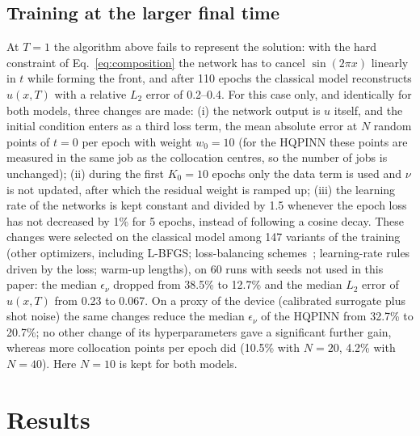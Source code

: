 \documentclass[floatfix,aps,pra,twocolumn,showpacs,superscriptaddress,10pt,nofootinbib]{revtex4-2}
\newif\ifshowtodos \showtodostrue
\newcommand{\TODO}[1]{\ifshowtodos\textcolor{red}{\textbf{[TODO:} #1\textbf{]}}\fi}
\begin{document}
\subsection{Training at the larger final time}\label{sec:adjust}
At $T=1$ the algorithm above fails to represent the solution: with the hard constraint of Eq.~\eqref{eq:composition} the network has to cancel $\sin(2\pi x)$ linearly in $t$ while forming the front, and after 110 epochs the classical model reconstructs $u(x,T)$ with a relative $L_2$ error of 0.2--0.4. For this case only, and identically for both models, three changes are made: (i) the network output is $u$ itself, and the initial condition enters as a third loss term, the mean absolute error at $N$ random points of $t=0$ per epoch with weight $w_0=10$ (for the HQPINN these points are measured in the same job as the collocation centres, so the number of jobs is unchanged); (ii) during the first $K_0=10$ epochs only the data term is used and $\nu$ is not updated, after which the residual weight is ramped up; (iii) the learning rate of the networks is kept constant and divided by 1.5 whenever the epoch loss has not decreased by 1\% for 5 epochs, instead of following a cosine decay. These changes were selected on the classical model among 147 variants of the training (other optimizers, including L-BFGS; loss-balancing schemes~\cite{wang2021understanding}; learning-rate rules driven by the loss; warm-up lengths), on 60 runs with seeds not used in this paper: the median $\epsilon_\nu$ dropped from 38.5\% to 12.7\% and the median $L_2$ error of $u(x,T)$ from 0.23 to 0.067. On a proxy of the device (calibrated surrogate plus shot noise) the same changes reduce the median $\epsilon_\nu$ of the HQPINN from 32.7\% to 20.7\%; no other change of its hyperparameters gave a significant further gain, whereas more collocation points per epoch did (10.5\% with $N=20$, 4.2\% with $N=40$). Here $N=10$ is kept for both models.

\newpage
\section{Results}\label{sec:results}
\end{document}
